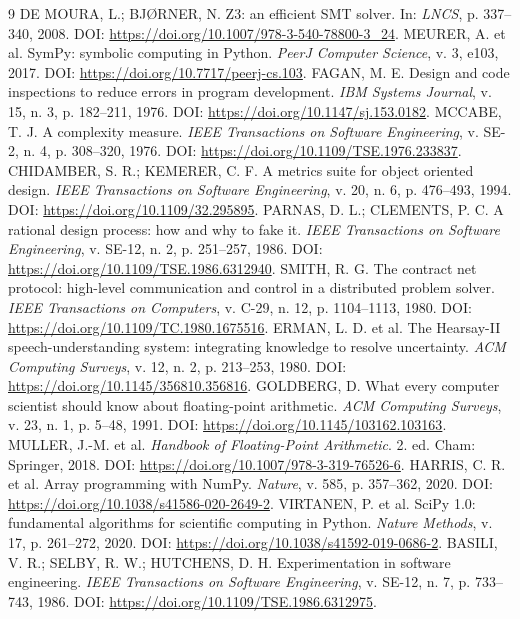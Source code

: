 \begin{thebibliography}{9}
 DE MOURA, L.; BJØRNER, N. Z3: an efficient SMT solver. In: \textit{LNCS}, p. 337--340, 2008. DOI: \url{https://doi.org/10.1007/978-3-540-78800-3_24}.
 MEURER, A. et al. SymPy: symbolic computing in Python. \textit{PeerJ Computer Science}, v. 3, e103, 2017. DOI: \url{https://doi.org/10.7717/peerj-cs.103}.
 FAGAN, M. E. Design and code inspections to reduce errors in program development. \textit{IBM Systems Journal}, v. 15, n. 3, p. 182--211, 1976. DOI: \url{https://doi.org/10.1147/sj.153.0182}.
 MCCABE, T. J. A complexity measure. \textit{IEEE Transactions on Software Engineering}, v. SE-2, n. 4, p. 308--320, 1976. DOI: \url{https://doi.org/10.1109/TSE.1976.233837}.
 CHIDAMBER, S. R.; KEMERER, C. F. A metrics suite for object oriented design. \textit{IEEE Transactions on Software Engineering}, v. 20, n. 6, p. 476--493, 1994. DOI: \url{https://doi.org/10.1109/32.295895}.
 PARNAS, D. L.; CLEMENTS, P. C. A rational design process: how and why to fake it. \textit{IEEE Transactions on Software Engineering}, v. SE-12, n. 2, p. 251--257, 1986. DOI: \url{https://doi.org/10.1109/TSE.1986.6312940}.
 SMITH, R. G. The contract net protocol: high-level communication and control in a distributed problem solver. \textit{IEEE Transactions on Computers}, v. C-29, n. 12, p. 1104--1113, 1980. DOI: \url{https://doi.org/10.1109/TC.1980.1675516}.
 ERMAN, L. D. et al. The Hearsay-II speech-understanding system: integrating knowledge to resolve uncertainty. \textit{ACM Computing Surveys}, v. 12, n. 2, p. 213--253, 1980. DOI: \url{https://doi.org/10.1145/356810.356816}.
 GOLDBERG, D. What every computer scientist should know about floating-point arithmetic. \textit{ACM Computing Surveys}, v. 23, n. 1, p. 5--48, 1991. DOI: \url{https://doi.org/10.1145/103162.103163}.
 MULLER, J.-M. et al. \textit{Handbook of Floating-Point Arithmetic}. 2. ed. Cham: Springer, 2018. DOI: \url{https://doi.org/10.1007/978-3-319-76526-6}.
 HARRIS, C. R. et al. Array programming with NumPy. \textit{Nature}, v. 585, p. 357--362, 2020. DOI: \url{https://doi.org/10.1038/s41586-020-2649-2}.
 VIRTANEN, P. et al. SciPy 1.0: fundamental algorithms for scientific computing in Python. \textit{Nature Methods}, v. 17, p. 261--272, 2020. DOI: \url{https://doi.org/10.1038/s41592-019-0686-2}.
 BASILI, V. R.; SELBY, R. W.; HUTCHENS, D. H. Experimentation in software engineering. \textit{IEEE Transactions on Software Engineering}, v. SE-12, n. 7, p. 733--743, 1986. DOI: \url{https://doi.org/10.1109/TSE.1986.6312975}.

\end{thebibliography}
